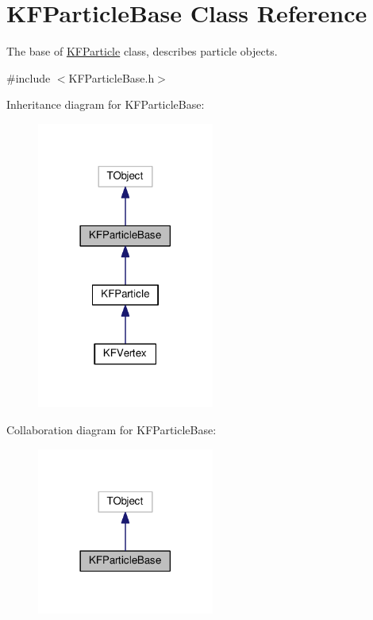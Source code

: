 \hypertarget{classKFParticleBase}{}\section{K\+F\+Particle\+Base Class Reference}
\label{classKFParticleBase}


The base of \hyperlink{classKFParticle}{K\+F\+Particle} class, describes particle objects.  




{\ttfamily \#include $<$K\+F\+Particle\+Base.\+h$>$}



Inheritance diagram for K\+F\+Particle\+Base\+:
\nopagebreak
\begin{figure}[H]
\begin{center}
\leavevmode
\includegraphics[width=165pt]{classKFParticleBase__inherit__graph}
\end{center}
\end{figure}


Collaboration diagram for K\+F\+Particle\+Base\+:
\nopagebreak
\begin{figure}[H]
\begin{center}
\leavevmode
\includegraphics[width=165pt]{classKFParticleBase__coll__graph}
\end{center}
\end{figure}
